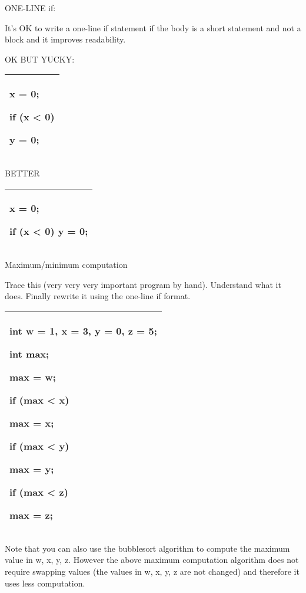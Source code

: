 \documentclass[
]{article}
\begin{document}
ONE-LINE if:

It's OK to write a one-line if statement if the body is a short
statement and not a block and it improves readability.

OK BUT YUCKY:

\begin{longtable}[]{@{}l@{}}
\toprule
\endhead
\begin{minipage}[t]{0.97\columnwidth}\raggedright
x = 0;

if (x \textless{} 0)

y = 0;\strut
\end{minipage}\tabularnewline
\bottomrule
\end{longtable}

BETTER

\begin{longtable}[]{@{}l@{}}
\toprule
\endhead
\begin{minipage}[t]{0.97\columnwidth}\raggedright
x = 0;

if (x \textless{} 0) y = 0;\strut
\end{minipage}\tabularnewline
\bottomrule
\end{longtable}

Maximum/minimum computation

Trace this (very very very important program by hand). Understand what
it does. Finally rewrite it using the one-line if format.

\begin{longtable}[]{@{}l@{}}
\toprule
\endhead
\begin{minipage}[t]{0.97\columnwidth}\raggedright
int w = 1, x = 3, y = 0, z = 5;

int max;

max = w;

if (max \textless{} x)

max = x;

if (max \textless{} y)

max = y;

if (max \textless{} z)

max = z;\strut
\end{minipage}\tabularnewline
\bottomrule
\end{longtable}

Note that you can also use the bubblesort algorithm to compute the
maximum value in w, x, y, z. However the above maximum computation
algorithm does not require swapping values (the values in w, x, y, z are
not changed) and therefore it uses less computation.
\end{document}
